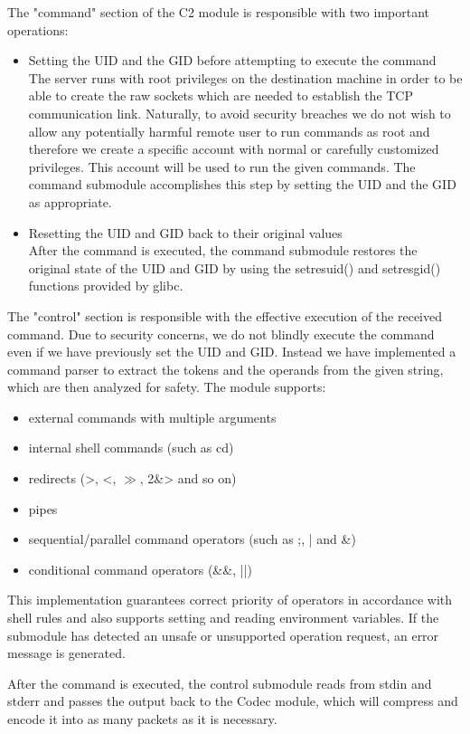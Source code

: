 The "command" section of the C2 module is responsible with two important operations:
\begin{itemize}
\item Setting the UID and the GID before attempting to execute the command \\
The server runs with root privileges on the destination machine in order to be
able to create the raw sockets which are needed to establish the TCP communication
link. Naturally, to avoid security breaches we do not wish to allow any potentially
harmful remote user to run commands as root and therefore we create a specific
account with normal or carefully customized privileges. This account will be used
to run the given commands. The command submodule accomplishes this step by setting
the UID and the GID as appropriate.
\item Resetting the UID and GID back to their original values \\
After the command is executed, the command submodule restores the original state
of the UID and GID by using the setresuid() and setresgid() functions provided by glibc.
\end{itemize}

The "control" section is responsible with the effective execution of the received
command. Due to security concerns, we do not blindly execute the command even if
we have previously set the UID and GID. Instead we have implemented a command parser
to extract the tokens and the operands from the given string, which are then
analyzed for safety. The module supports:
\begin{itemize}
\item external commands with multiple arguments
\item internal shell commands (such as cd)
\item redirects (>, <, $\gg$, 2\&> and so on)
\item pipes
\item sequential/parallel command operators (such as ;, | and \&)
\item conditional command operators (\&\&, ||) 
\end{itemize}

This implementation guarantees correct priority of operators in accordance with
shell rules and also supports setting and reading environment variables.
If the submodule has detected an unsafe or unsupported operation request,
an error message is generated.

After the command is executed, the control submodule reads from stdin and stderr
and passes the output back to the Codec module, which will compress and encode
it into as many packets as it is necessary.

